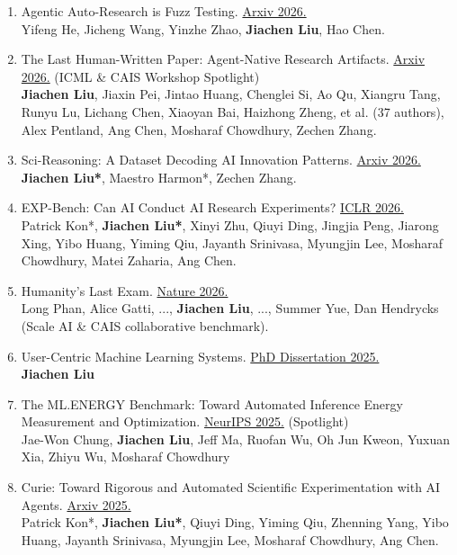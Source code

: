 \documentclass{article}
\begin{document}
\begin{enumerate}[itemsep=-7pt]

\item Agentic Auto-Research is Fuzz Testing. \underline{Arxiv 2026.}\\
Yifeng He, Jicheng Wang, Yinzhe Zhao, \textbf{Jiachen Liu}, Hao Chen.

\item The Last Human-Written Paper: Agent-Native Research Artifacts. \underline{Arxiv 2026.} (ICML \& CAIS Workshop Spotlight)\\
\textbf{Jiachen Liu}, Jiaxin Pei, Jintao Huang, Chenglei Si, Ao Qu, Xiangru Tang, Runyu Lu, Lichang Chen, Xiaoyan Bai, Haizhong Zheng, et al. (37 authors), Alex Pentland, Ang Chen, Mosharaf Chowdhury, Zechen Zhang.

\item Sci-Reasoning: A Dataset Decoding AI Innovation Patterns. \underline{Arxiv 2026.}\\
\textbf{Jiachen Liu*}, Maestro Harmon*, Zechen Zhang.

\item EXP-Bench: Can AI Conduct AI Research Experiments? \underline{ICLR 2026.}\\
Patrick Kon*, \textbf{Jiachen Liu*}, Xinyi Zhu, Qiuyi Ding, Jingjia Peng, Jiarong Xing, Yibo Huang, Yiming Qiu, Jayanth Srinivasa, Myungjin Lee, Mosharaf Chowdhury, Matei Zaharia, Ang Chen.

\item Humanity's Last Exam. \underline{Nature 2026.}\\
Long Phan, Alice Gatti, ..., \textbf{Jiachen Liu}, ..., Summer Yue, Dan Hendrycks (Scale AI \& CAIS collaborative benchmark).

\item User-Centric Machine Learning Systems. \underline{PhD Dissertation 2025.}\\
\textbf{Jiachen Liu}

\item The ML.ENERGY Benchmark: Toward Automated Inference Energy Measurement and Optimization.
\underline{NeurIPS 2025.} (Spotlight)\\
Jae-Won Chung, \textbf{Jiachen Liu}, Jeff Ma, Ruofan Wu, Oh Jun Kweon, Yuxuan Xia, Zhiyu Wu, Mosharaf Chowdhury

\item Curie: Toward Rigorous and Automated Scientific Experimentation with AI Agents. \underline{Arxiv 2025.}\\
Patrick Kon*, \textbf{Jiachen Liu*}, Qiuyi Ding, Yiming Qiu, Zhenning Yang, Yibo Huang, Jayanth Srinivasa, Myungjin Lee, Mosharaf Chowdhury, Ang Chen.


\end{enumerate}
\end{document}
